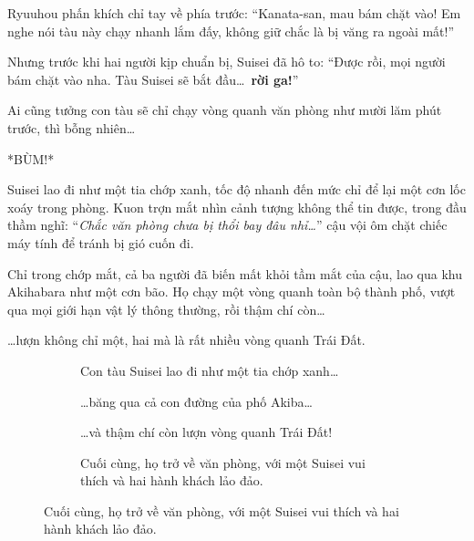 \documentclass[../main.tex]{subfiles}
\begin{document}
Ryuuhou phấn khích chỉ tay về phía trước: ``Kanata-san, mau bám chặt vào! Em nghe nói tàu này chạy nhanh lắm đấy, không giữ chắc là bị văng ra ngoài mất!''

Nhưng trước khi hai người kịp chuẩn bị, Suisei đã hô to: ``Được rồi, mọi người bám chặt vào nha. Tàu Suisei sẽ bắt đầu\dots\ \textbf{rời ga!}''

Ai cũng tưởng con tàu sẽ chỉ chạy vòng quanh văn phòng như mười lăm phút trước, thì bỗng nhiên\dots

*BÙM!*

Suisei lao đi như một tia chớp xanh, tốc độ nhanh đến mức chỉ để lại một cơn lốc xoáy trong phòng. Kuon trợn mắt nhìn cảnh tượng không thể tin được, trong đầu thầm nghĩ: ``\textit{Chắc văn phòng chưa bị thổi bay đâu nhỉ\dots}'' cậu vội ôm chặt chiếc máy tính để tránh bị gió cuốn đi.

Chỉ trong chớp mắt, cả ba người đã biến mất khỏi tầm mắt của cậu, lao qua khu Akihabara như một cơn bão. Họ chạy một vòng quanh toàn bộ thành phố, vượt qua mọi giới hạn vật lý thông thường, rồi thậm chí còn\dots

\dots lượn không chỉ một, hai mà là rất nhiều vòng quanh Trái Đất.

\begin{figure}[H]
  \centering
  \begin{subfigure}[t]{0.45\textwidth}
    \centering
    \caption{Con tàu Suisei lao đi như một tia chớp xanh\dots}
  \end{subfigure}
  \quad
  \begin{subfigure}[t]{0.45\textwidth}
    \centering
    \caption{\dots băng qua cả con đường của phố Akiba\dots}
  \end{subfigure}
  \quad
  \begin{subfigure}[t]{0.45\textwidth}
    \centering
    \caption{\dots và thậm chí còn lượn vòng quanh Trái Đất!}
  \end{subfigure}
  \quad
  \begin{subfigure}[t]{0.45\textwidth}
    \centering
    \caption{Cuối cùng, họ trở về văn phòng, với một Suisei vui thích và hai hành khách lảo đảo.}
  \end{subfigure}
\end{figure}
\end{document}
